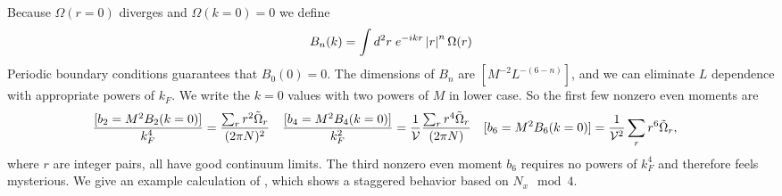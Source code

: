 Because $\Omega(r=0)$ diverges and $\Omega(k=0)=0$ we define
\begin{align}
	B_n(k) = \int d^2r\; e^{-i k r} \left| r \right|^n \Omega(r) 
\end{align}
Periodic boundary conditions guarantees that $B_0(0) = 0$.
The dimensions of $B_n$ are $[M^{-2} L^{-(6-n)}]$, and we can eliminate $L$ dependence with appropriate powers of $k_F$.
We write the $k=0$ values with two powers of $M$ in lower case.
So the first few nonzero even moments are
\begin{align}
	\frac{[b_2 = M^2 B_2(k=0)]}{k_F^4} &= \frac{\sum_r r^2 \tilde{\Omega}_r}{(2\pi N)^2}
	&
	\frac{[b_4 = M^2 B_4(k=0)]}{k_F^2} &= \frac{1}{\mathcal{V}} \frac{\sum_r r^4 \tilde{\Omega}_r}{(2\pi N)}
	&
	[b_6 = M^2 B_6(k=0)] &= \frac{1}{\mathcal{V}^2}\sum_r r^6 \tilde{\Omega}_r,
	\label{eq:voricity moments}
\end{align}
where $r$ are integer pairs, all have good continuum limits.
The third nonzero even moment $b_6$ requires no powers of $k_F^4$ and therefore feels mysterious.
We give an example calculation of , which shows a staggered behavior based on $N_x\mod{4}$.
